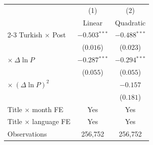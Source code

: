 \begin{tabular}{lcc}
\toprule
 & (1) & (2) \\
 & Linear & Quadratic \\
\cmidrule(lr){2-3}
Turkish $\times$ Post & $-0.503$$^{***}$ & $-0.488$$^{***}$ \\
 & ($0.016$) & ($0.023$) \\[3pt]
$\times\ \Delta\ln P$ & $-0.287$$^{***}$ & $-0.294$$^{***}$ \\
 & ($0.055$) & ($0.055$) \\[3pt]
$\times\ (\Delta\ln P)^2$ &  & $-0.157$ \\
 &  & ($0.181$) \\[3pt]
\midrule
Title $\times$ month FE & Yes & Yes \\
Title $\times$ language FE & Yes & Yes \\
Observations & 256,752 & 256,752 \\
\bottomrule
\end{tabular}
